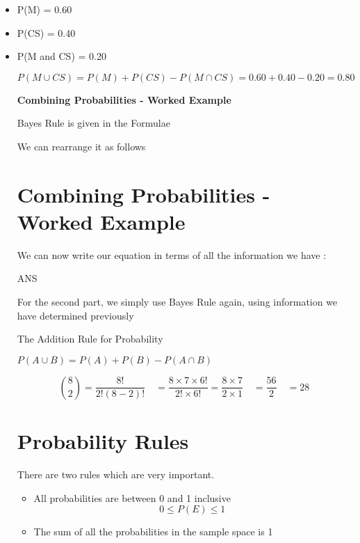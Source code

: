 \begin{itemize}
\item P(M) = 0.60
\item P(CS) = 0.40
\item P(M and CS) = 0.20

\[  P(M \cup CS) = P(M) + P(CS) - P(M \cap CS) 

= 0.60 + 0.40 -0.20 
= 0.80
\] 














\textbf{Combining Probabilities - Worked Example}

Bayes Rule is given in the Formulae  

We can rearrange it as follows  



\section{Combining Probabilities - Worked Example}
We can now write our equation in terms of all the information we have :

ANS

For the second part, we simply use Bayes Rule again, using information we have determined previously


The Addition Rule for Probability

$P(A \cup B ) = P(A) + P(B) - P(A \cap B)$

\[{8 \choose 2} =\frac{8!}{2!(8-2)!} \quad = \frac{8\times7\times6!}{2!\times 6!} = \frac{8\times7}{2\times 1} \quad = \frac{56}{2} \quad = 28\]


\section{Probability Rules}

There are two rules which are very important.
\begin{itemize}
\item All probabilities are between 0 and 1 inclusive
\[0 \leq P(E) \leq 1\]
\item The sum of all the probabilities in the sample space is 1



\end{itemize}
\end{itemize}
